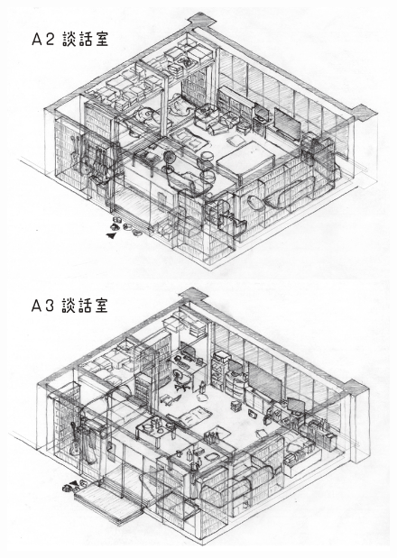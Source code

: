 \newpage
\begin{figure}[bh]
\vspace{10mm}
\centering
\includegraphics[]{gazo/談話室sketch_page-0002.jpg}
\end{figure}

